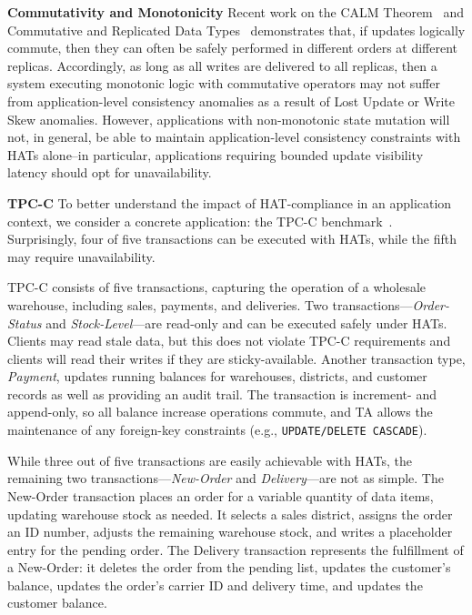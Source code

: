 \vspace{.5em}\noindent\textbf{Commutativity and Monotonicity} Recent
work on the CALM Theorem~\cite{calm} and Commutative and Replicated
Data Types~\cite{crdt} demonstrates that, if updates logically
commute, then they can often be safely performed in different orders
at different replicas. Accordingly, as long as all writes are
delivered to all replicas, then a system executing monotonic logic
with commutative operators may not suffer from application-level
consistency anomalies as a result of Lost Update or Write Skew
anomalies. However, applications with non-monotonic state mutation
will not, in general, be able to maintain application-level
consistency constraints with HATs alone--in particular, applications
requiring bounded update visibility latency should opt for
unavailability.

\vspace{.5em}\noindent\textbf{TPC-C} To better understand the impact
of HAT-compliance in an application context, we consider a concrete
application: the TPC-C benchmark~\cite{tpcc}. Surprisingly, four of
five transactions can be executed with HATs, while the fifth may
require unavailability.

TPC-C consists of five transactions, capturing the operation of a
wholesale warehouse, including sales, payments, and deliveries. Two
transactions---\textit{Order-Status} and \textit{Stock-Level}---are
read-only and can be executed safely under HATs. Clients may read
stale data, but this does not violate TPC-C requirements and clients
will read their writes if they are sticky-available. Another
transaction type, \textit{Payment}, updates running balances for
warehouses, districts, and customer records as well as providing an
audit trail. The transaction is increment- and append-only, so all
balance increase operations commute, and TA allows the
maintenance of any foreign-key constraints (e.g.,
\texttt{UPDATE/DELETE CASCADE}).

While three out of five transactions are easily achievable with
HATs, the remaining two transactions---\textit{New-Order} and
\textit{Delivery}---are not as simple. The New-Order transaction
places an order for a variable quantity of data items, updating
warehouse stock as needed. It selects a sales district, assigns the
order an ID number, adjusts the remaining warehouse stock, and writes
a placeholder entry for the pending order. The Delivery transaction
represents the fulfillment of a New-Order: it deletes the order from
the pending list, updates the customer's balance, updates the order's
carrier ID and delivery time, and updates the customer balance.

